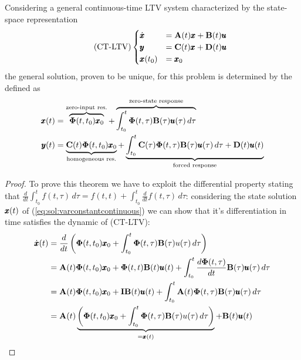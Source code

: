 	\begin{theorem}
		Considering a general continuous-time LTV system characterized by the state-space representation
		\begin{equation} \tag{CT-LTV} \label{CTLTV}
			\begin{cases}
				\dot{\pmb{x}} & = \mathbf{A}(t) \pmb{x} + \mathbf{B}(t) \pmb{u} \\ \pmb{y} & = \mathbf{C}(t) \pmb{x} + \mathbf{D}(t) \pmb{u} \\ \pmb{x}(t_0) & = \pmb{x}_0 
			\end{cases} 
		\end{equation}
		the general solution, proven to be unique, for this problem is determined by the  defined as
		\begin{equation} \label{eq:sol:varconstantcontinuous}
		\begin{split}
			\pmb{x}(t) & = \overbrace{\mathbf{\Phi}(t,t_0) \pmb{x}_0}^\textrm{zero-input res.} + \overbrace{\int_{t_0}^t \mathbf{\Phi}(t,\tau) \mathbf{B}(\tau) \pmb{u}(\tau)\, d\tau}^\textrm{zero-state response} \\
			\pmb{y}(t) & = \underbrace{\mathbf{C}(t)\mathbf{\Phi}(t,t_0) \pmb{x}_0}_\textrm{homogeneous res.} + \underbrace{\int_{t_0}^t \mathbf{C}(\tau) \mathbf{\Phi}(t,\tau) \mathbf{B}(\tau) \pmb{u}(\tau) \, d\tau + \mathbf{D}(t) \pmb{u}(t)}_\textrm{forced response}
		\end{split}
		\end{equation}
	\end{theorem}
	\begin{proof}
		To prove this theorem we have to exploit the differential property stating that $\frac d{dt} \int_{t_0}^t f(t,\tau)\, d\tau = f(t,t) + \int_{t_0}^t \frac d{dt} f(t,\tau)\, d\tau$: considering the state solution $\pmb{x}(t)$ of (\ref{eq:sol:varconstantcontinuous}) we can show that it's differentiation in time satisfies the dynamic of (CT-LTV):
		\begin{align*}
			\dot{\pmb{x}}(t) & = \frac d{dt} \left( \mathbf{\Phi}(t,t_0)\pmb{x}_0 + \int_{t_0}^t \mathbf{\Phi}(t,\tau)\mathbf{B}(\tau)u(\tau)\, d\tau \right) \\ 
			& = \mathbf{A}(t) \mathbf{\Phi}(t,t_0)\pmb{x}_0 + \mathbf{\Phi}(t,t)\mathbf{B}(t)\pmb{u}(t) + \int_{t_0}^t \frac{d\mathbf{\Phi}(t,\tau)}{dt} \mathbf{B}(\tau)\pmb{u}(\tau) \, d\tau \\
			& = \mathbf{A}(t) \mathbf{\Phi}(t,t_0)\pmb{x}_0 + \mathbf{I} \mathbf{B}(t)\pmb{u}(t) + \int_{t_0}^t \mathbf{A}(t) \mathbf{\Phi}(t,\tau) \mathbf{B}(\tau)\pmb{u}(\tau) \, d\tau \\
			& = \mathbf{A}(t) \underbrace{\left(  \mathbf{\Phi}(t,t_0)\pmb{x}_0 + \int_{t_0}^t \mathbf{\Phi}(t,\tau)\mathbf{B}(\tau)u(\tau)\, d\tau \right)}_{=\pmb{x}(t)} + \mathbf{B}(t)\pmb{u}(t)
		\end{align*}
	\end{proof}

